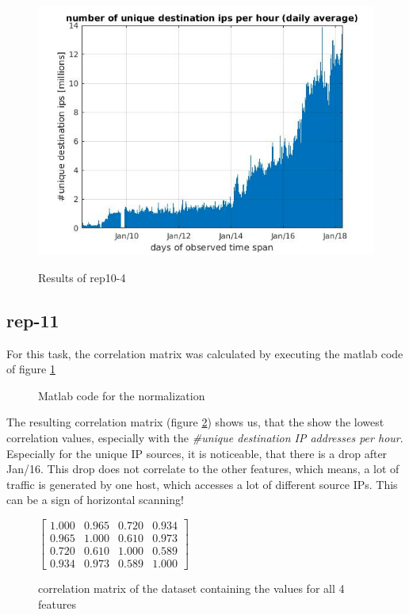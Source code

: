 \begin{figure}[H]
\center
\includegraphics[width=.7\textwidth]{./chapters/plots/rep10_4.jpg}\\
\caption{Results of rep10-4}
\end{figure}

\subsection*{rep-11}
For this task, the correlation matrix was calculated by executing the matlab code of figure \ref{fig:correlation}
\begin{figure}[H]

\caption{Matlab code for the normalization}
\label{fig:correlation}
\end{figure}
The resulting correlation matrix (figure \ref{matrix:correlation}) shows us, that the  show the lowest correlation values, especially with the \textit{\#unique destination IP addresses per hour}. Especially for the unique IP sources, it is noticeable, that there is a drop after Jan/16. This drop does not correlate to the other features, which means, a lot of traffic is generated by one host, which accesses a lot of different source IPs. This can be a sign of horizontal scanning!

\begin{figure}[H]
\center
$
\begin{bmatrix}
1.000 &  0.965 &  0.720 &  0.934 \\
0.965 &  1.000 &  0.610 &  0.973 \\
0.720 &  0.610 &  1.000 &  0.589 \\
0.934 &  0.973 &  0.589 &  1.000
\end{bmatrix}
$
\caption{correlation matrix of the dataset containing the values for all 4 features}
\label{matrix:correlation}
\end{figure}

